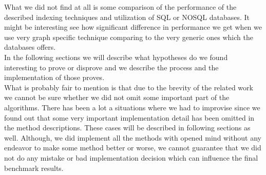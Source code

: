 What we did not find at all is some comparison of the performance of the described indexing techniques and utilization of SQL or NOSQL databases. It might be interesting see how significant difference in performance we get when we use very graph specific technique comparing to the very generic ones which the databases offers.\\

In the following sections we will describe what hypotheses do we found interesting to prove or disprove and we describe the process and the implementation of those proves.\\

What is probably fair to mention is that due to the brevity of the related work we cannot be sure whether we did not omit some important part of the algorithms. There has been a lot a situations where we had to improvise since we found out that some very important implementation detail has been omitted in the method descriptions. These cases will be described in following sections as well. Although, we did implement all the methods with opened mind without any endeavor to make some method better or worse, we cannot guarantee that we did not do any mistake or bad implementation decision which can influence the final benchmark results.